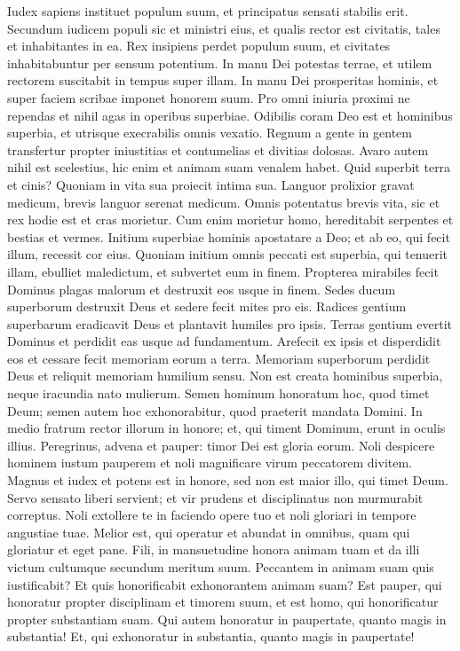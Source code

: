 \begin{biblechapter}  
\verse Iudex sapiens instituet populum suum, et principatus sensati stabilis erit. 
\verse Secundum iudicem populi sic et ministri eius, et qualis rector est civitatis, tales et inhabitantes in ea. 
\verse Rex insipiens perdet populum suum, et civitates inhabitabuntur per sensum potentium. 
\verse In manu Dei potestas terrae, et utilem rectorem suscitabit in tempus super illam. 
\verse In manu Dei prosperitas hominis, et super faciem scribae imponet honorem suum. 
\verse Pro omni iniuria proximi ne rependas et nihil agas in operibus superbiae. 
\verse Odibilis coram Deo est et hominibus superbia, et utrisque execrabilis omnis vexatio. 
\verse Regnum a gente in gentem transfertur propter iniustitias et contumelias et divitias dolosas. 
\verse Avaro autem nihil est scelestius, hic enim et animam suam venalem habet. 
\verse Quid superbit terra et cinis? Quoniam in vita sua proiecit intima sua. 
\verse Languor prolixior gravat medicum, brevis languor serenat medicum. 
\verse Omnis potentatus brevis vita, sic et rex hodie est et cras morietur. 
\verse Cum enim morietur homo, hereditabit serpentes et bestias et vermes. 
\verse Initium superbiae hominis apostatare a Deo; 
\verse et ab eo, qui fecit illum, recessit cor eius. Quoniam initium omnis peccati est superbia, qui tenuerit illam, ebulliet maledictum, et subvertet eum in finem. 
\verse Propterea mirabiles fecit Dominus plagas malorum et destruxit eos usque in finem. 
\verse Sedes ducum superborum destruxit Deus et sedere fecit mites pro eis. 
\verse Radices gentium superbarum eradicavit Deus et plantavit humiles pro ipsis. 
\verse Terras gentium evertit Dominus et perdidit eas usque ad fundamentum. 
\verse Arefecit ex ipsis et disperdidit eos et cessare fecit memoriam eorum a terra. 
\verse Memoriam superborum perdidit Deus et reliquit memoriam humilium sensu. 
\verse Non est creata hominibus superbia, neque iracundia nato mulierum. 
\verse Semen hominum honoratum hoc, quod timet Deum; semen autem hoc exhonorabitur, quod praeterit mandata Domini. 
\verse In medio fratrum rector illorum in honore; et, qui timent Dominum, erunt in oculis illius. 
\verse Peregrinus, advena et pauper: timor Dei est gloria eorum. 
\verse Noli despicere hominem iustum pauperem et noli magnificare virum peccatorem divitem. 
\verse Magnus et iudex et potens est in honore, sed non est maior illo, qui timet Deum. 
\verse Servo sensato liberi servient; et vir prudens et disciplinatus non murmurabit correptus. 
\verse Noli extollere te in faciendo opere tuo et noli gloriari in tempore angustiae tuae. 
\verse Melior est, qui operatur et abundat in omnibus, quam qui gloriatur et eget pane. 
\verse Fili, in mansuetudine honora animam tuam et da illi victum cultumque secundum meritum suum. 
\verse Peccantem in animam suam quis iustificabit? Et quis honorificabit exhonorantem animam suam? 
\verse Est pauper, qui honoratur propter disciplinam et timorem suum, et est homo, qui honorificatur propter substantiam suam. 
\verse Qui autem honoratur in paupertate, quanto magis in substantia! Et, qui exhonoratur in substantia, quanto magis in paupertate! 
\end{biblechapter}

